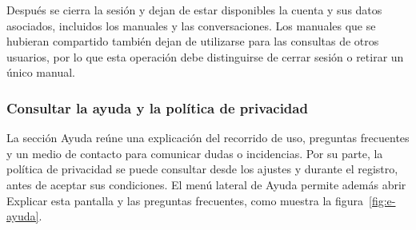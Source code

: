 Después se cierra la sesión y dejan de estar disponibles la cuenta y sus
datos asociados, incluidos los manuales y las conversaciones. Los manuales
que se hubieran compartido también dejan de utilizarse para las consultas
de otros usuarios, por lo que esta operación debe distinguirse de cerrar
sesión o retirar un único manual.

\subsubsection{Consultar la ayuda y la política de privacidad}

La sección \guillemotleft{}Ayuda\guillemotright{} reúne una explicación
del recorrido de uso, preguntas frecuentes y un medio de contacto para
comunicar dudas o incidencias. Por su parte, la política de privacidad se
puede consultar desde los ajustes y durante el registro, antes de aceptar
sus condiciones. El menú lateral de \guillemotleft{}Ayuda\guillemotright{} permite además
abrir \guillemotleft{}Explicar esta pantalla\guillemotright{} y las preguntas frecuentes,
como muestra la figura~\ref{fig:e-ayuda}.


\endgroup
